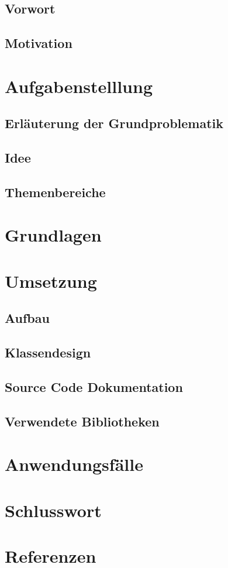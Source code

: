 \documentclass[a4paper,12pt]{article}
\begin{document}
\subsection{Vorwort}

\subsection{Motivation}

\section{Aufgabenstelllung}

\subsection{Erläuterung der Grundproblematik}

\subsection{Idee}

\subsection{Themenbereiche}

\section{Grundlagen}

\section{Umsetzung}

\subsection{Aufbau}

\subsection{Klassendesign}

\subsection{Source Code Dokumentation}

\subsection{Verwendete Bibliotheken}

\section{Anwendungsfälle}

\section{Schlusswort}

\section{Referenzen}
\end{document}

